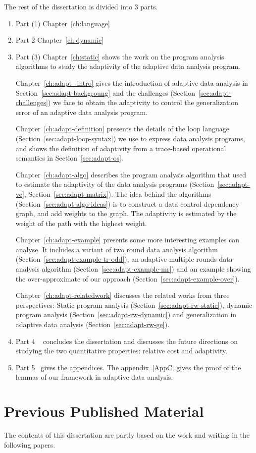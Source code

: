 The rest of the dissertation is divided into $3$ parts. 
\begin{enumerate}
    \item Part (1) Chapter~\ref{ch:language}
    
    \item Part {2} Chapter~\ref{ch:dynamic}
    
    \item Part (3) Chapter~\ref{ch:static} shows the work on the program analysis algorithms to study the adaptivity of the adaptive data analysis program.    

Chapter~\ref{ch:adapt_intro} gives the introduction of adaptive data analysis in Section~\ref{sec:adapt-backgroung} and the challenges (Section~\ref{sec:adapt-challenges}) we face to obtain the adaptivity to control the generalization error of an adaptive data analysis program.

Chapter~\ref{ch:adapt-definition} presents the details of the loop language (Section~\ref{sec:adapt-loop-syntax}) we use to express data analysis programs, and shows the definition of adaptivity from a trace-based operational semantics in Section~\ref{sec:adapt-os}. 


Chapter~\ref{ch:adapt-algo} describes the program analysis algorithm {\ADAPTSYSTEM} that used to estimate the adaptivity of the data analysis programs (Section~\ref{sec:adapt-ve}, Section~\ref{sec:adapt-matrix}). 
The idea behind the algorithms (Section~\ref{sec:adapt-algo-ideas}) is to construct a data control dependency graph, and add weights to the graph. The adaptivity is estimated by the weight of the path with the highest weight.

Chapter~\ref{ch:adapt-example} presents some more interesting examples {\ADAPTSYSTEM} can analyse. 
It includes a variant of two round data analysis algorithm (Section~\ref{sec:adapt-example-tr-odd}), 
an adaptive multiple rounds data analysis algorithm (Section~\ref{sec:adapt-example-mr}) and an example showing the over-approximate of our approach (Section~\ref{sec:adapt-example-over}). 

Chapter~\ref{ch:adapt-relatedwork} discusses the related works from three perspectives: Static program analysis (Section~\ref{sec:adapt-rw-static}), dynamic program analysis (Section~\ref{sec:adapt-rw-dynamic}) and generalization in adaptive data analysis (Section~\ref{sec:adapt-rw-ge}).  
\item Part {4} ~ concludes the dissertation and discusses the future directions on studying the two quantitative properties: relative cost and adaptivity.
\item Part {5} ~gives the appendices. 
 The appendix~\ref{AppC} gives the proof of the lemmas of our framework in adaptive data analysis.    
\end{enumerate}



\section{Previous Published Material}
The contents of this dissertation are partly based on the work and writing in the following papers.



